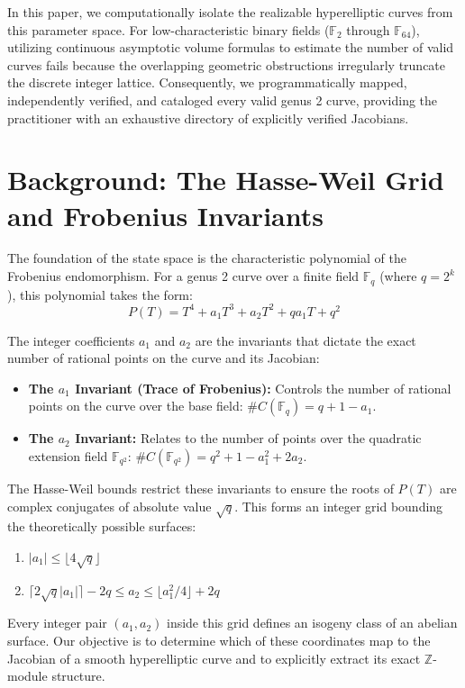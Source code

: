 \documentclass[letterpaper, 11pt]{article}
\begin{document}
In this paper, we computationally isolate the realizable hyperelliptic curves from this parameter space. For low-characteristic binary fields ($\mathbb{F}_2$ through $\mathbb{F}_{64}$), utilizing continuous asymptotic volume formulas to estimate the number of valid curves fails because the overlapping geometric obstructions irregularly truncate the discrete integer lattice. Consequently, we programmatically mapped, independently verified, and cataloged every valid genus 2 curve, providing the practitioner with an exhaustive directory of explicitly verified Jacobians.

\section{Background: The Hasse-Weil Grid and Frobenius Invariants}
The foundation of the state space is the characteristic polynomial of the Frobenius endomorphism. For a genus 2 curve over a finite field $\mathbb{F}_q$ (where $q = 2^k$), this polynomial takes the form:
\[ P(T) = T^4 + a_1 T^3 + a_2 T^2 + q a_1 T + q^2 \]

The integer coefficients $a_1$ and $a_2$ are the invariants that dictate the exact number of rational points on the curve and its Jacobian:
\begin{itemize}
    \item \textbf{The $a_1$ Invariant (Trace of Frobenius):} Controls the number of rational points on the curve over the base field: $\#C(\mathbb{F}_q) = q + 1 - a_1$.
    \item \textbf{The $a_2$ Invariant:} Relates to the number of points over the quadratic extension field $\mathbb{F}_{q^2}$: $\#C(\mathbb{F}_{q^2}) = q^2 + 1 - a_1^2 + 2a_2$.
\end{itemize}

The Hasse-Weil bounds restrict these invariants to ensure the roots of $P(T)$ are complex conjugates of absolute value $\sqrt{q}$. This forms an integer grid bounding the theoretically possible surfaces:
\begin{enumerate}
    \item $|a_1| \le \lfloor 4\sqrt{q} \rfloor$
    \item $\lceil 2\sqrt{q}|a_1| \rceil - 2q \le a_2 \le \lfloor a_1^2/4 \rfloor + 2q$
\end{enumerate}
Every integer pair $(a_1, a_2)$ inside this grid defines an isogeny class of an abelian surface. Our objective is to determine which of these coordinates map to the Jacobian of a smooth hyperelliptic curve and to explicitly extract its exact $\mathbb{Z}$-module structure.
\end{document}
